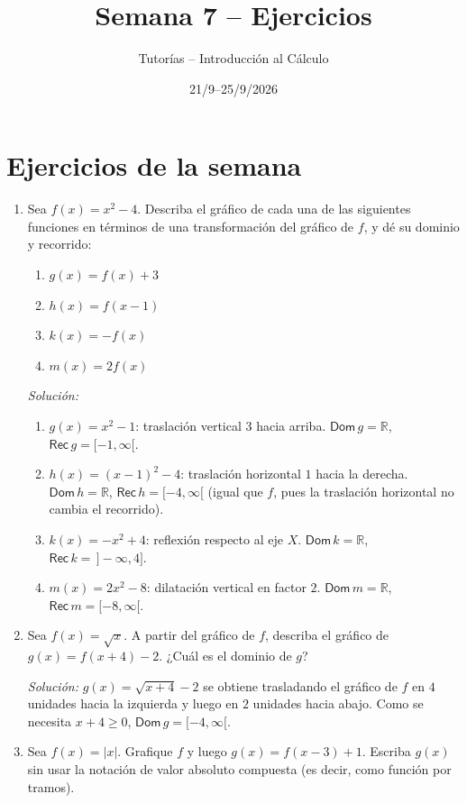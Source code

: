 \documentclass[11pt]{article}
\title{Semana 7 -- Ejercicios}
\author{Tutorías -- Introducción al Cálculo}
\date{21/9--25/9/2026}
\begin{document}
\maketitle

\section{Ejercicios de la semana}

\begin{enumerate}[label=\arabic*.]

\item Sea $f(x) = x^2 - 4$. Describa el gráfico de cada una de las siguientes
funciones en términos de una transformación del gráfico de $f$, y dé su
dominio y recorrido:
\begin{enumerate}[label=(\alph*)]
\item $g(x) = f(x) + 3$
\item $h(x) = f(x-1)$
\item $k(x) = -f(x)$
\item $m(x) = 2f(x)$
\end{enumerate}

\textit{Solución:}
\begin{enumerate}[label=(\alph*)]
\item $g(x) = x^2-1$: traslación vertical $3$ hacia arriba. $\mathsf{Dom}\,g=\mathbb{R}$,
$\mathsf{Rec}\,g=[-1,\infty[$.
\item $h(x) = (x-1)^2-4$: traslación horizontal $1$ hacia la derecha. $\mathsf{Dom}\,h=\mathbb{R}$,
$\mathsf{Rec}\,h=[-4,\infty[$ (igual que $f$, pues la traslación horizontal no cambia el
recorrido).
\item $k(x) = -x^2+4$: reflexión respecto al eje $X$. $\mathsf{Dom}\,k=\mathbb{R}$,
$\mathsf{Rec}\,k=\,]-\infty,4]$.
\item $m(x) = 2x^2-8$: dilatación vertical en factor $2$. $\mathsf{Dom}\,m=\mathbb{R}$,
$\mathsf{Rec}\,m=[-8,\infty[$.
\end{enumerate}

\item Sea $f(x) = \sqrt{x}$. A partir del gráfico de $f$, describa el gráfico
de $g(x) = f(x+4) - 2$. ¿Cuál es el dominio de $g$?

\textit{Solución:} $g(x) = \sqrt{x+4}-2$ se obtiene trasladando el gráfico de $f$ en $4$ unidades
hacia la izquierda y luego en $2$ unidades hacia abajo. Como se necesita $x+4\ge0$,
$\mathsf{Dom}\,g = [-4,\infty[$.

\item Sea $f(x) = |x|$. Grafique $f$ y luego $g(x) = f(x-3)+1$. Escriba $g(x)$
sin usar la notación de valor absoluto compuesta (es decir, como función por
tramos).


\end{enumerate}
\end{document}
